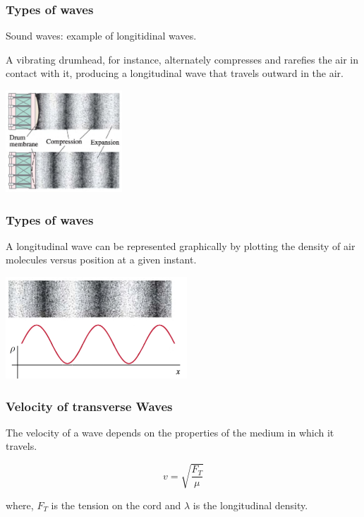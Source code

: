 \documentclass[]{beamer}
\begin{document}
\begin{frame}
\frametitle{Types of waves}

Sound waves: example of longitidinal waves.
\pause

\vspace{5mm}

 A vibrating drumhead, for instance, alternately compresses and rarefies the air in contact with it,
producing a longitudinal wave that travels outward in the air. 
\pause
 \begin{center}
  \includegraphics[height=1.5in]{images4/5.jpg}
\end{center}

  \end{frame}


\begin{frame}
\frametitle{Types of waves}

A longitudinal wave can be represented graphically by plotting the density of
air molecules versus position at a given instant.
\pause

 \begin{center}
  \includegraphics[height=1.5in]{images4/4.jpg}
\end{center}

  \end{frame}



\begin{frame}
\frametitle{Velocity of transverse Waves}
The velocity of a wave depends on the properties of the medium in which it travels.
\pause

\begin{equation}
v=\sqrt{\frac{F_T}{\mu}}
\end{equation}
\pause

where, $F_T$ is the tension on the cord and $\lambda$ is the longitudinal density.


  \end{frame}
\end{document}
